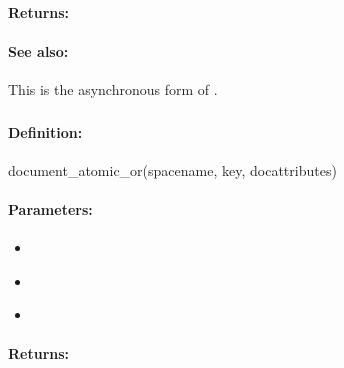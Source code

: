 \paragraph{Returns:}


\paragraph{See also:}  This is the asynchronous form of .

\pagebreak
\subsubsection{}
\label{api:ruby:document_atomic_or}


\paragraph{Definition:}
\begin{rubycode}
document_atomic_or(spacename, key, docattributes)
\end{rubycode}

\paragraph{Parameters:}
\begin{itemize}[noitemsep]
\item {}\\

\item {}\\

\item {}\\

\end{itemize}

\paragraph{Returns:}


\pagebreak
\subsubsection{}
\label{api:ruby:async_document_atomic_or}



